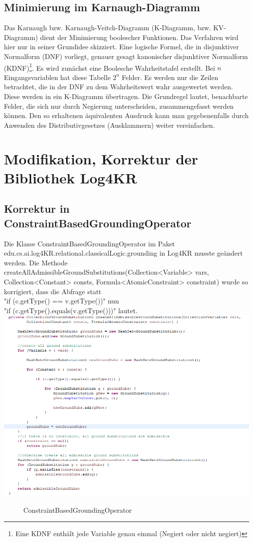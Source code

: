 \documentclass[a4paper, 11pt]{book}
\begin{document}
{	\section{Minimierung im Karnaugh-Diagramm}\label{Min_K_Dia} 
	Das Karnaugh bzw. Karnaugh-Veitch-Diagramm (K-Diagramm, bzw. KV-Diagramm) dient der Minimierung boolescher Funktionen. Das Verfahren wird hier nur in seiner Grundidee skizziert. Eine logische Formel, die in disjunktiver Normalform (DNF) vorliegt, genauer gesagt kanonischer disjunktiver Normalform (KDNF)\footnote{Eine KDNF enthält jede Variable genau einmal (Negiert oder nicht negiert)}. Es wird zunächst eine Boolesche Wahrheitstafel erstellt. Bei $ n $ Eingangsvariablen hat diese Tabelle $ 2^{n} $ Felder. Es werden nur die Zeilen betrachtet, die in der DNF zu dem Wahrheitswert wahr ausgewertet werden. Diese werden in ein K-Diagramm übertragen.  Die Grundregel lautet, benachbarte Felder, die sich nur durch Negierung unterscheiden, zusammengefasst werden können. Den so erhaltenen äquivalenten Ausdruck kann man gegebenenfalls durch Anwenden des Distributivgesetzes (Ausklammern) weiter vereinfachen.

\chapter{Modifikation, Korrektur der Bibliothek Log4KR}
\section{Korrektur in ConstraintBasedGroundingOperator}
\label{sec:Korrektur1}
Die Klasse ConstraintBasedGroundingOperator im Paket edu.cs.ai.log4KR.relational.classicalLogic.grounding in Log4KR musste geändert werden. Die Methode createAllAdmissibleGroundSubstitutions(Collection<Variable> vars,
Collection<Constant> consts, Formula<AtomicConstraint> constraint) wurde so korrigiert, dass die Abfrage statt\\
 "{}if (c.getType() == v.getType())"{} 
nun \\
"{}if (c.getType().equals(v.getType()))"{} lautet.\\
\includegraphics[scale = 1.0]{Graphics/Aenderung_1}
\begin{figure}[h]
	\caption{ConstraintBasedGroundingOperator}
\end{figure}


}
\end{document}
